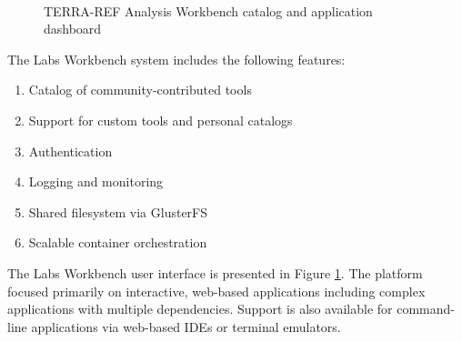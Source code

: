 \documentclass{sig-alternate}
\begin{document}
\begin{figure}[!ht]
\\
\caption{TERRA-REF Analysis Workbench catalog and application dashboard}
\label{fig.ui}
\end{figure}

The Labs Workbench system includes the following features:
\begin{enumerate}
\itemsep-0.2em
\item Catalog of community-contributed tools 
\item Support for custom tools and personal catalogs
\item Authentication
\item Logging and monitoring
\item Shared filesystem via GlusterFS
\item Scalable container orchestration
\end{enumerate}

The Labs Workbench user interface is presented in Figure \ref{fig.ui}.  The platform focused primarily on interactive, web-based applications including complex applications with multiple dependencies. Support is also available for command-line applications via web-based IDEs or terminal emulators.  
\end{document}

